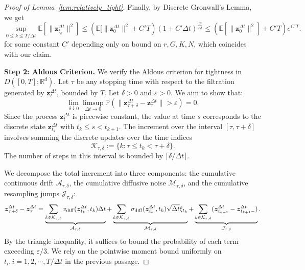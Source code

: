 \documentclass{article}
\newcommand{\mathbbm}[1]{\boldsymbol{#1}}
\theoremstyle{plain}
\theoremstyle{definition}
\theoremstyle{remark}
\renewcommand{\P}{{\mathbb{P}}}
\newcommand{\R}{{\mathbb{R}}}
\begin{document}
\begin{proof}[Proof of Lemma~\ref{lem:relatively_tight}]
    Finally, by Discrete Gronwall's Lemma, we get
    \[
    \sup_{0 \le k \le T/\Delta t}\mathbb{E}[\|\mathbbm{z}^{\Delta t}_{t_{k}}\|^2]
    \le \left( \mathbb{E}[\|\mathbbm{z}^{\Delta t}_0\|^2 + C' T \right) (1 + C' \Delta t)^{\frac{T}{\Delta t}} \le \left( \mathbb{E}[\|\mathbbm{z}^{\Delta t}_0\|^2] + C' T \right) e^{C' T}.
    \]
    for some constant \(C'\) depending only on bound on \(r,G,K,N\), which coincides with our claim.
    
    \textbf{Step 2: Aldous Criterion.} 
    We verify the Aldous criterion for tightness in $D([0,T]; \R^d)$. Let $\tau$ be any stopping time with respect to the filtration generated by $\mathbbm{z}^{\Delta t}_{t}$, bounded by $T$. Let $\delta > 0$ and $\varepsilon > 0$. We aim to show that:
    \[
    \lim_{\delta \downarrow 0} \limsup_{\Delta t \to 0} \P\left( \|\mathbbm{z}^{\Delta t}_{\tau+\delta} - \mathbbm{z}^{\Delta t}_{\tau}\| > \varepsilon \right) = 0.
    \]
    Since the process $\mathbbm{z}^{\Delta t}_{t}$ is piecewise constant, the value at time $s$ corresponds to the discrete state $\mathbbm{z}^{\Delta t}_{t_k}$ with $t_k \le s < t_{k+1}$. The increment over the interval $[\tau, \tau+\delta]$ involves summing the discrete updates over the time indices 
    \[\mathcal{K}_{\tau, \delta} := \{k : \tau \le t_k < \tau+\delta\}.\] 
    The number of steps in this interval is bounded by $\lceil \delta/\Delta t \rceil$.
    
    We decompose the total increment into three components: the cumulative continuous drift $\mathcal{A}_{\tau,\delta}$, the cumulative diffusive noise $\mathcal{M}_{\tau,\delta}$, and the cumulative resampling jumps $\mathcal{J}_{\tau,\delta}$:
    \[
    \mathbbm{z}^{\Delta t}_{\tau+\delta} - \mathbbm{z}^{\Delta t}_{\tau} = 
    \underbrace{\sum_{k \in \mathcal{K}_{\tau, \delta}} v_{\rm diff}(\mathbbm{z}^{\Delta t}_{t_k},t_k) \Delta t}_{\mathcal{A}_{\tau,\delta}} + 
    \underbrace{\sum_{k \in \mathcal{K}_{\tau, \delta}} \sigma_{\rm diff}(\mathbbm{z}^{\Delta t}_{t_k},t_k)\sqrt{\Delta t}\xi_{t_k}}_{\mathcal{M}_{\tau,\delta}} + 
    \underbrace{\sum_{k \in \mathcal{K}_{\tau, \delta}} (\mathbbm{z}^{\Delta t}_{t_{k+1}} - \mathbbm{z}^{\Delta t}_{t_{k+1}-})}_{\mathcal{J}_{\tau,\delta}}.
    \]
    By the triangle inequality, it suffices to bound the probability of each term exceeding $\varepsilon/3$. We rely on the pointwise moment bound uniformly on \(t_i,i=1,2,\cdots, T/\Delta t\) in the previous passage.
    

\end{proof}
\end{document}
